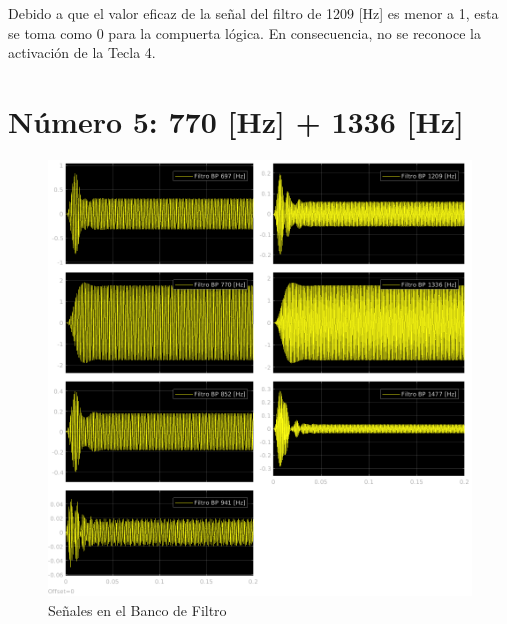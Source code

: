 Debido a que el valor eficaz de la señal del filtro de 1209 [Hz] es menor a 1, esta se toma como 0 para la compuerta lógica. En consecuencia, no se reconoce la activación de la Tecla 4.


\section{Número 5: 770 [Hz] + 1336 [Hz]}
\label{sec:signal_5}
\begin{figure}[H]
  \centering
  \includegraphics[width=\linewidth]{images/simulacion/fallas/bank/5.png}
  \caption{Señales en el Banco de Filtro}
  \label{fig:num_5_bank}
\end{figure}

